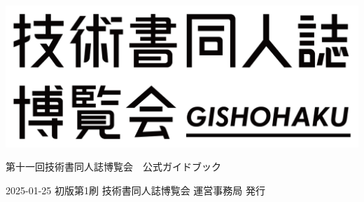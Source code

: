 \clearpage{\thispagestyle{empty}}
\begin{center}

\includegraphics[width=0.75\linewidth]{images/chap-title/logo.png}
\vspace{80pt}

\begin{sffamily}
\Large
第十一回技術書同人誌博覧会　公式ガイドブック
\normalsize
\end{sffamily}
\vspace{320pt}

\begin{sffamily}
2025-01-25
\hspace{5pt}
初版第1刷
\hspace{5pt}
技術書同人誌博覧会 運営事務局
\hspace{5pt}
発行
\end{sffamily}

\end{center}
